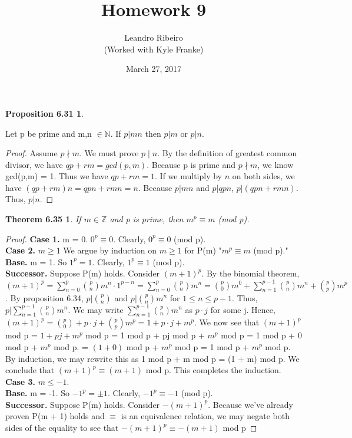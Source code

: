 \documentclass[12pt]{amsart}
\newcommand{\N}{\mathbb{N}}
\newcommand{\Z}{\mathbb{Z}}
\begin{document}
\title{Homework 9}
\date{March 27, 2017}
\author{Leandro Ribeiro\\(Worked with Kyle Franke)}

\maketitle

\newtheorem*{prop6.31}{Proposition 6.31}

\begin{prop6.31}
\end{prop6.31}
	Let p be prime and m,n $\in \N$. If $p | mn$ then
$p | m$ or $p | n$.
\begin{proof}
	Assume $p \nmid m$. We must prove $p \mid n$. By the definition of greatest common divisor, we have $qp + rm = gcd(p,m)$. Because p is prime and $p \nmid m$, we know gcd(p,m) = 1. Thus we have $qp + rm = 1$. If we multiply by $n$ on both sides, we have $(qp + rm)n = qpn + rmn = n$. Because $p | mn$ and $p | qpn$, $p | (qpn + rmn)$. Thus, $p | n$.
\end{proof}

\newtheorem*{thm6.35}{Theorem 6.35}
\begin{thm6.35}
	If $m \in \Z$ and p is prime, then \center $m^{p} \equiv m$ (mod p).
\end{thm6.35}

\begin{proof}
	\textbf{Case 1.} m = 0. $0^{p} \equiv 0$. Clearly, $0^{p} \equiv 0$ (mod p).
	\\\indent\textbf{Case 2.} $m \geq 1$
	We argue by induction on $m \geq 1$ for P(m) "$m^{p} \equiv m$ (mod p)."
	\\\textbf{Base.} m = 1. So $1^{p} = 1$. Clearly, $1^{p} \equiv 1$ (mod p).
	\\\textbf{Successor.} Suppose P(m) holds. Consider $(m + 1)^{p}$. By the binomial theorem, $(m + 1)^{p} = \sum_{n=0}^{p} {{p}\choose{n}} m^{n} \cdot 1^{p-n}
	= \sum_{n=0}^{p} {{p}\choose{n}} m^{n} = {{p}\choose{0}} m^{0} + \sum_{n=1}^{p-1} {p\choose n} m^{n} + {p\choose p} m^{p}$. By proposition 6.34, $p | {p\choose n}$ and $p | {p\choose n} m^n$ for $1 \leq n \leq p-1$. Thus, $p | \sum_{n=1}^{p-1} {p\choose n} m^n$. We may write $\sum_{n=1}^{p-1} {p\choose n} m^n$ as $p \cdot j$ for some j. Hence, $(m + 1)^p = {p\choose 0} + p \cdot j + {p\choose p} m^{p} = 1 + p \cdot j + m^{p}$. We now see that $(m + 1)^p$ mod p = $1 + pj + m^{p}$ mod p = 1 mod p + pj mod p + $m^{p}$ mod p = 1 mod p + 0 mod p + $m^{p}$ mod p. = $(1 + 0)$ mod p + $m^p$ mod p = 1 mod p + $m^p$ mod p. By induction, we may rewrite this as 1 mod p + m mod p = (1 + m) mod p. We conclude that $(m + 1)^p \equiv (m + 1)$ mod p. This completes the induction.
	\\\textbf{Case 3.} $m \leq - 1$. 
	\\\textbf{Base.} m = -1. So $-1^{p} = \pm1$. Clearly, $-1^{p} \equiv -1$ (mod p).
	\\\textbf{Successor.} Suppose P(m) holds. Consider $-(m + 1)^{p}$. Because we've already proven P(m + 1) holds and $\equiv$ is an equivalence relation, we may negate both sides of the equality to see that $-(m + 1)^p \equiv -(m + 1)$ mod p
\end{proof}
\end{document}
